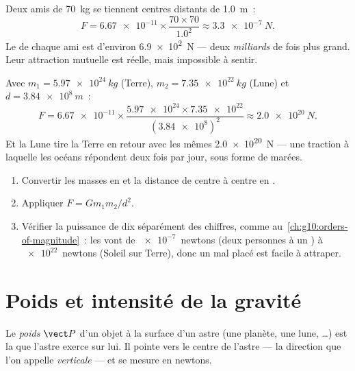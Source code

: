 \begin{example}\label{ex:g10:universal-gravitation:friends}
Deux amis de \qty{70}{kg} se tiennent centres distants de
\qty{1.0}{m}~:
\[
F = \num{6.67e-11} \times \frac{70 \times 70}{1.0^2}
\approx \qty{3.3e-7}{N}.
\]
Le  de chaque ami est d'environ \qty{6.9e2}{N} --- deux
\emph{milliards} de fois plus grand. Leur attraction mutuelle est
réelle, mais impossible à sentir.
\end{example}

\begin{example}\label{ex:g10:universal-gravitation:earthmoon}
Avec $m_1 = \qty{5.97e24}{kg}$ (Terre), $m_2 = \qty{7.35e22}{kg}$ (Lune)
et $d = \qty{3.84e8}{m}$~:
\[
F = \num{6.67e-11} \times
\frac{\num{5.97e24} \times \num{7.35e22}}{(\num{3.84e8})^2}
\approx \qty{2.0e20}{N}.
\]
Et la Lune tire la Terre en retour avec les mêmes \qty{2.0e20}{N} ---
une traction à laquelle les océans répondent deux fois par jour, sous
forme de marées.
\end{example}

\begin{method}\label{met:g10:universal-gravitation:compute}
\begin{enumerate}
  \item Convertir les masses en  et la distance de
        centre à centre en .
  \item Appliquer $F = G m_1 m_2 / d^2$.
  \item Vérifier la puissance de dix séparément des chiffres, comme
        au~\cref{ch:g10:orders-of-magnitude}~: les  vont de $\num{e-7}$~newtons (deux personnes
        à un ) à $\num{e22}$~newtons (Soleil sur Terre),
        donc un  mal placé est facile à attraper.
\end{enumerate}
\end{method}

\section{Poids et intensité de la gravité}

\begin{definition}[Poids]\label{def:g10:universal-gravitation:weight}
Le \emph{poids} $\vect P$ d'un objet à la surface d'un
astre (une planète, une lune, \dots) est la  que l'astre exerce sur lui. Il pointe vers le centre
de l'astre --- la direction que l'on appelle
\emph{verticale} --- et se mesure en newtons.
\end{definition}

